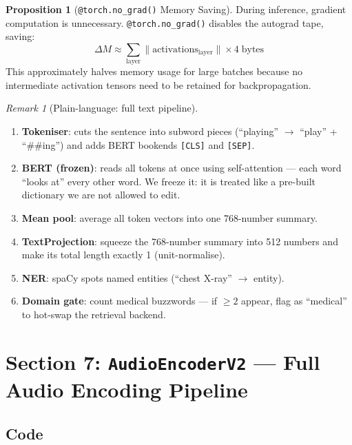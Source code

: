 \documentclass[12pt,a4paper]{article}
\theoremstyle{definition}
\newtheorem{proposition}[theorem]{Proposition}
\theoremstyle{remark}
\newtheorem{remark}[theorem]{Remark}
\begin{document}
\begin{proposition}[\texttt{@torch.no\_grad()} Memory Saving]
During inference, gradient computation is unnecessary.
\texttt{@torch.no\_grad()} disables the autograd tape, saving:
\[
  \Delta M \approx \sum_{\text{layer}} \|\text{activations}_{\text{layer}}\|
  \times 4\;\text{bytes}
\]
This approximately halves memory usage for large batches because no
intermediate activation tensors need to be retained for backpropagation.
\end{proposition}

\begin{remark}[Plain-language: full text pipeline]
\begin{enumerate}
  \item \textbf{Tokeniser}: cuts the sentence into subword pieces
    (``playing'' $\to$ ``play'' + ``\#\#ing'') and adds BERT bookends
    \texttt{[CLS]} and \texttt{[SEP]}.
  \item \textbf{BERT (frozen)}: reads all tokens at once using self-attention
    — each word ``looks at'' every other word. We freeze it: it is treated
    like a pre-built dictionary we are not allowed to edit.
  \item \textbf{Mean pool}: average all token vectors into one 768-number summary.
  \item \textbf{TextProjection}: squeeze the 768-number summary into 512 numbers
    and make its total length exactly 1 (unit-normalise).
  \item \textbf{NER}: spaCy spots named entities (``chest X-ray'' $\to$ entity).
  \item \textbf{Domain gate}: count medical buzzwords — if $\geq 2$ appear,
    flag as ``medical'' to hot-swap the retrieval backend.
\end{enumerate}
\end{remark}

\section{Section 7: \texttt{AudioEncoderV2} — Full Audio Encoding Pipeline}

\subsection{Code}
\end{document}
